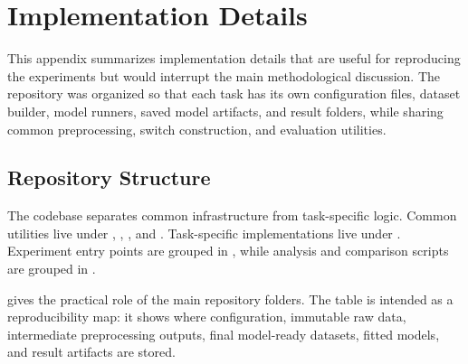 \chapter{Implementation Details}
\label{app:implementation-details}

This appendix summarizes implementation details that are useful for
reproducing the experiments but would interrupt the main methodological
discussion. The repository was organized so that each task has its own
configuration files, dataset builder, model runners, saved model artifacts, and
result folders, while sharing common preprocessing, switch construction, and
evaluation utilities.

\section{Repository Structure}
\label{app:repository-structure}

The codebase separates common infrastructure from task-specific logic. Common
utilities live under , , ,
and . Task-specific implementations live under
. Experiment entry points are grouped in
, while analysis and comparison scripts
are grouped in .

 gives the practical role of the main
repository folders. The table is intended as a reproducibility map: it shows
where configuration, immutable raw data, intermediate preprocessing outputs,
final model-ready datasets, fitted models, and result artifacts are stored.

